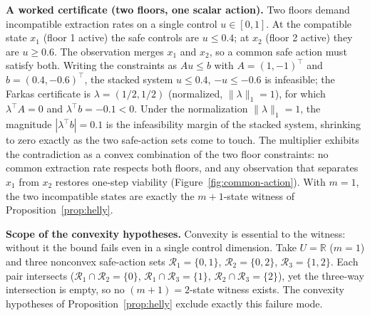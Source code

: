 \documentclass[10pt,twocolumn]{article}
\theoremstyle{definition}
\begin{document}
\textbf{A worked certificate (two floors, one scalar action).} Two
floors demand incompatible extraction rates on a single control
\(u\in[0,1]\). At the compatible state \(x_1\) (floor 1 active) the safe
controls are \(u\le 0.4\); at \(x_2\) (floor 2 active) they are
\(u\ge 0.6\). The observation merges \(x_1\) and \(x_2\), so a common
safe action must satisfy both. Writing the constraints as \(Au\le b\)
with \(A=(1,-1)^{\top}\) and \(b=(0.4,-0.6)^{\top}\), the stacked system
\(u\le 0.4\), \(-u\le -0.6\) is infeasible; the Farkas certificate is
\(\lambda=(1/2,1/2)\) (normalized, \(\|\lambda\|_1=1\)), for which
\(\lambda^{\top}A=0\) and \(\lambda^{\top}b=-0.1<0\). Under the normalization
\(\|\lambda\|_1=1\), the magnitude \(|\lambda^{\top}b|=0.1\) is the
infeasibility margin of the stacked system, shrinking to zero exactly as
the two safe-action sets come to touch. The multiplier
exhibits the contradiction as a convex combination of the two floor
constraints: no common extraction rate respects both floors, and any
observation that separates \(x_1\) from \(x_2\) restores one-step
viability (Figure~\ref{fig:common-action}). With \(m=1\), the two
incompatible states are exactly the \(m+1\)-state witness of
Proposition~\ref{prop:helly}.

\textbf{Scope of the convexity hypotheses.} Convexity is essential to the witness: without it the bound fails even in a single control dimension. Take \(U=\mathbb R\) (\(m=1\)) and three nonconvex safe-action sets \(\mathcal R_1=\{0,1\}\), \(\mathcal R_2=\{0,2\}\), \(\mathcal R_3=\{1,2\}\). Each pair intersects (\(\mathcal R_1\cap\mathcal R_2=\{0\}\), \(\mathcal R_1\cap\mathcal R_3=\{1\}\), \(\mathcal R_2\cap\mathcal R_3=\{2\}\)), yet the three-way intersection is empty, so no \((m+1)=2\)-state witness exists. The convexity hypotheses of Proposition~\ref{prop:helly} exclude exactly this failure mode.
\end{document}
